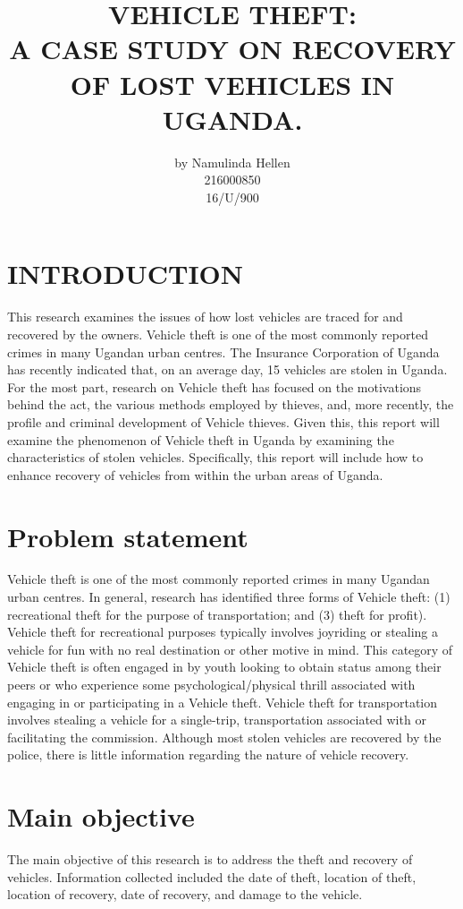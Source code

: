 \documentclass[10pt,letterpaper]{article}
\begin{document}
\title{VEHICLE THEFT:\\
A CASE STUDY ON RECOVERY OF LOST VEHICLES IN UGANDA.}
\author{by Namulinda Hellen  \\ 216000850 \\  16/U/900}
\maketitle
\section{INTRODUCTION }
 This research examines the issues of how lost vehicles are traced for and recovered by the owners.  Vehicle theft is one of the most commonly reported crimes in many Ugandan urban centres.  The Insurance Corporation of Uganda has recently indicated that, on an average day, 15 vehicles are stolen in Uganda. For the most part, research on Vehicle theft has focused on the motivations behind the act, the various methods employed by thieves, and, more recently, the profile and criminal development of Vehicle thieves. Given this, this report will examine the phenomenon of Vehicle theft in Uganda by examining the characteristics of stolen vehicles. Specifically, this report will include how to enhance recovery of vehicles from within the urban areas of Uganda. 
\section{Problem statement }
Vehicle theft is one of the most commonly reported crimes in many Ugandan urban centres. In general, research has identified three forms of Vehicle theft: (1) recreational theft for the purpose of transportation; and (3) theft for profit). Vehicle theft for recreational purposes typically involves joyriding or stealing a vehicle for fun with no real destination or other motive in mind. This category of Vehicle theft is often engaged in by youth looking to obtain status among their peers or who experience some psychological/physical thrill associated with engaging in or participating in a Vehicle theft. Vehicle theft for transportation involves stealing a vehicle for a single-trip, transportation associated with or facilitating the commission. Although most stolen vehicles are recovered by the police, there is little information regarding the nature of vehicle recovery.
\section{Main objective}
 The main objective of this research is to address the theft and recovery of vehicles. Information collected included the date of theft, location of theft, location of recovery, date of recovery, and damage to the vehicle.  
\end{document}
